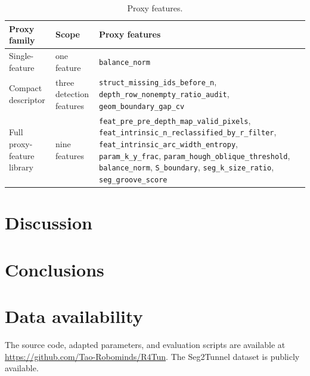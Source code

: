 \documentclass[a4paper,fleqn]{cas-dc}
\begin{document}
{\begin{table}[H]
\caption{Proxy features.}
\label{tab:proxy_ablation_families}
\centering
\footnotesize
\begin{tabular}{p{}p{}p{}}
\toprule
Proxy family & Scope & Proxy features \\
\midrule
Single-feature & one feature
& \texttt{balance\_norm} \\
\addlinespace
Compact descriptor & three detection features
& \texttt{struct\_missing\_ids\_before\_n}, \texttt{depth\_row\_nonempty\_ratio\_audit}, \texttt{geom\_boundary\_gap\_cv} \\
\addlinespace
Full proxy-feature library & nine features
& \texttt{feat\_pre\_pre\_depth\_map\_valid\_pixels}, \texttt{feat\_intrinsic\_n\_reclassified\_by\_r\_filter}, \texttt{feat\_intrinsic\_arc\_width\_entropy}, \texttt{param\_k\_y\_frac}, \texttt{param\_hough\_oblique\_threshold}, \texttt{balance\_norm}, \texttt{S\_boundary}, \texttt{seg\_k\_size\_ratio}, \texttt{seg\_groove\_score} \\
\bottomrule
\end{tabular}
\end{table}
\section{Discussion}\label{sec:discussion}

\section{Conclusions}\label{sec:conclusions}


\section*{Data availability}

The source code, adapted parameters, and evaluation scripts are available at \url{https://github.com/Tao-Robominds/R4Tun}. The Seg2Tunnel dataset is publicly available.

}
\end{document}

